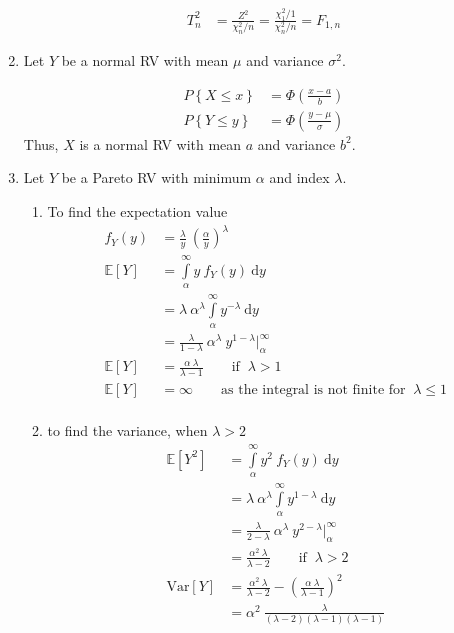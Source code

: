 \begin{enumerate}
		\begin{align}
			T^2_n &= \frac{Z^2}{\chi_n^{2} / n} = \frac{\chi_1^{2} / 1}{\chi_n^{2} / n} = F_{1, n}
		\end{align}
	
	
	\item Let $ Y $ be a normal RV with mean $ \mu $ and variance $ \sigma^2 $.
			
		\begin{align}
			P\left\{X \leq x\right\} &= \Phi\left(\frac{x-a}{b}\right) \nonumber \\
			P\left\{Y \leq y\right\} &= \Phi\left(\frac{y-\mu}{\sigma}\right) 
		\end{align}
		Thus, $ X $ is a normal RV with mean $ a $ and variance $ b^2 $.
	
	
	\item Let $ Y $ be a Pareto RV with minimum $ \alpha $ and index $ \lambda $.
			
		\begin{enumerate}
			\item To find the expectation value	\\
			\begin{align}
				f_Y(y) &= \frac{\lambda}{y}\ \left(\frac{\alpha}{y}\right)^\lambda  \nonumber \\
				\mathbb{E}[Y] &= \int\limits_{\alpha}^{\infty} y\ f_Y(y)\ \mathrm{d}y \nonumber \\
				&= \lambda\ \alpha^\lambda \int\limits_{\alpha}^{\infty} y^{-\lambda} \ \mathrm{d}y \nonumber \\
				&= \frac{\lambda}{1 - \lambda}\ \alpha^\lambda \ y^{1-\lambda}\Big|_\alpha^\infty \nonumber \\
				\mathbb{E}[Y] &= \frac{\alpha \ \lambda}{\lambda - 1} \qquad \text{if } \ \lambda > 1 \\
				\mathbb{E}[Y] &= \infty \qquad \text{as the integral is not finite for }\ \lambda \leq 1 \\
			\end{align}
			
			\item to find the variance, when $ \lambda > 2 $\\		
			\begin{align}
				\mathbb{E}[Y^2] &= \int\limits_{\alpha}^{\infty} y^2\ f_Y(y)\ \mathrm{d}y \nonumber \\
				&= \lambda\ \alpha^\lambda \int\limits_{\alpha}^{\infty} y^{1-\lambda} \ \mathrm{d}y \nonumber \\
				&= \frac{\lambda}{2 - \lambda}\ \alpha^\lambda \ y^{2-\lambda}\Big|_\alpha^\infty \nonumber \\
				&= \frac{\alpha^2 \ \lambda}{\lambda - 2} \qquad \text{if } \ \lambda > 2 \\
				\mathrm{Var}[Y] &= \frac{\alpha^2 \ \lambda}{\lambda - 2} - \left(\frac{\alpha \ \lambda}{\lambda - 1}\right)^2 \\
				&= \alpha^2\ \frac{\lambda}{(\lambda - 2)(\lambda - 1)(\lambda - 1)}
			\end{align}
		\end{enumerate}
	

\end{enumerate}
